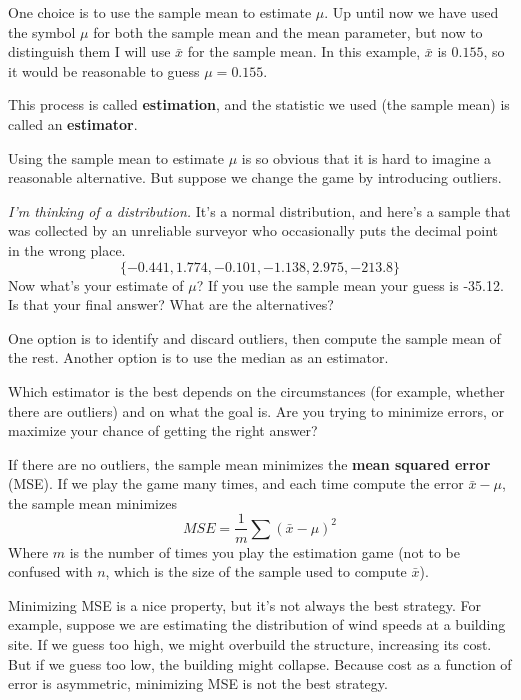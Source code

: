 \documentclass[12pt]{book}
\begin{document}
\newcommand{\xbar}{\bar{x}}
\newcommand{\ybar}{\bar{y}}

One choice is to use the sample mean to estimate $\mu$.  Up
until now we have used the symbol $\mu$ for both the sample mean and
the mean parameter, but now to distinguish them I will use $\xbar$
for the sample mean.  In this example, $\xbar$ is $0.155$, so it would
be reasonable to guess $\mu = 0.155$.

This process is called {\bf estimation}, and the statistic we used
(the sample mean) is called an {\bf estimator}.

Using the sample mean to estimate $\mu$ is so obvious that it is hard
to imagine a reasonable alternative.  But suppose we change the game by
introducing outliers.  


{\em I'm thinking of a distribution.}  It's a normal distribution, and
here's a sample that was collected by an unreliable surveyor who
occasionally puts the decimal point in the wrong place.
%
\[ \{ -0.441, 1.774, -0.101, -1.138, 2.975, -213.8 \} \]
%
Now what's your estimate of $\mu$?  If you use the sample mean your
guess is -35.12.  Is that your final answer?  What are the alternatives?

One option is to identify and discard outliers, then compute the sample
mean of the rest.  Another option is to use the median as an estimator.

Which estimator is the best depends on the circumstances (for example,
whether there are outliers) and on what the goal is.  Are you
trying to minimize errors, or maximize your chance of getting the
right answer?

If there are no outliers, the sample mean minimizes the {\bf mean squared
error} (MSE).  If we play the game many times, and each time
compute the error $\xbar - \mu$, the sample mean minimizes
%
\[ MSE = \frac{1}{m} \sum (\xbar - \mu)^2 \]
%
Where $m$ is the number of times you play the estimation game (not to
be confused with $n$, which is the size of the sample used to compute
$\xbar$). 

Minimizing MSE is a nice property, but it's not always the best
strategy.  For example, suppose we are estimating the distribution of
wind speeds at a building site.  If we guess too high, we might
overbuild the structure, increasing its cost.  But if we guess too
low, the building might collapse.  Because cost as a function of
error is asymmetric, minimizing MSE is not the best strategy.
\end{document}
